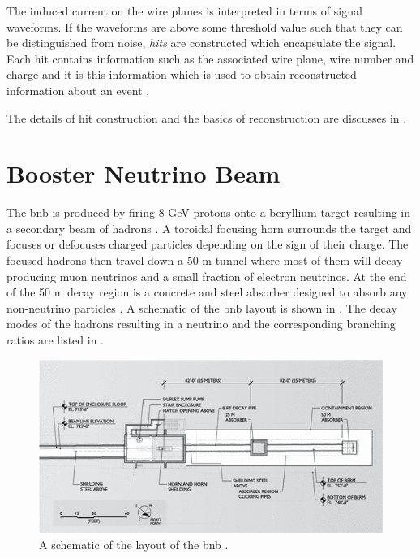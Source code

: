 The induced current on the wire planes is interpreted in terms of signal waveforms. If the waveforms are above some threshold value such that they can be distinguished from noise, \textit{hits} are constructed which encapsulate the signal. Each hit contains information such as the associated wire plane, wire number and charge and it is this information which is used to obtain reconstructed information about an event \cite{Design_and_Construction_of_the_MicroBooNE_Detector}.

The details of hit construction and the basics of reconstruction are discusses in .





\section{Booster Neutrino Beam}\label{sec:BNB}
The \gls{bnb} is produced by firing 8 GeV protons onto a beryllium target resulting in a secondary beam of hadrons \cite{FNAL_proton_accelerator}. A toroidal focusing horn surrounds the target and focuses or defocuses charged particles depending on the sign of their charge. The focused hadrons then travel down a 50 m tunnel where most of them will decay producing muon neutrinos and a small fraction of electron neutrinos. At the end of the 50 m decay region is a concrete and steel absorber designed to absorb any non-neutrino particles \cite{SciBooNE_BNB_description}. A schematic of the \gls{bnb} layout is shown in . The decay modes of the hadrons resulting in a neutrino and the corresponding branching ratios are listed in . 

\begin{figure}
    \centering
    \includegraphics[width = \textwidth]{figures-chap3/BNB_schematic.png}
    \caption[Schematic of the BNB layout.]{A schematic of the layout of the \gls{bnb} \cite{BNB_flux}.}
    \label{fig: BNB schematic}
\end{figure}

